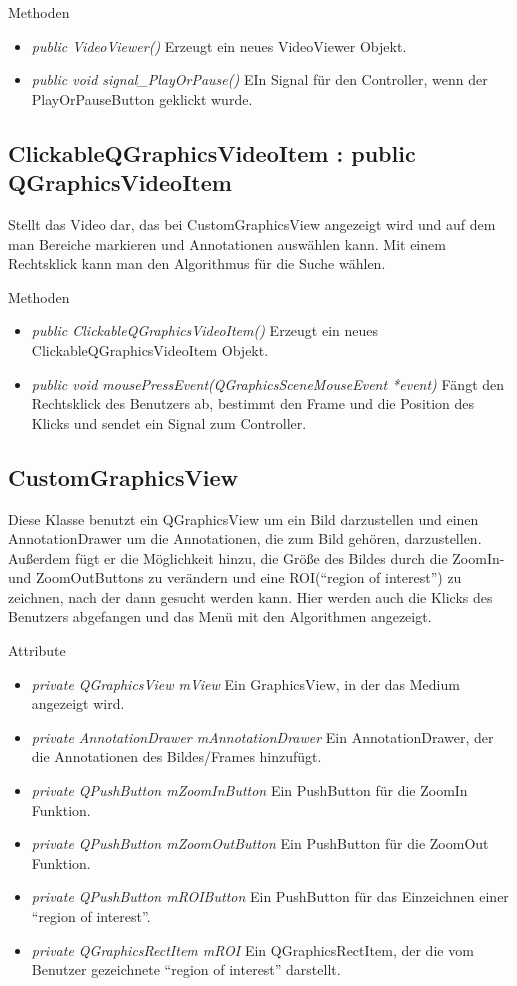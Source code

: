Methoden
\begin{itemize}
	\item\textit{public VideoViewer()} Erzeugt ein neues VideoViewer Objekt.
	\item\textit{public void signal\_PlayOrPause()} EIn Signal für den Controller, wenn der PlayOrPauseButton geklickt wurde.
\end{itemize} 

\subsection*{ClickableQGraphicsVideoItem : public QGraphicsVideoItem}
Stellt das Video dar, das bei CustomGraphicsView angezeigt wird und auf dem man Bereiche markieren und Annotationen auswählen kann. Mit einem Rechtsklick kann man den Algorithmus für die Suche wählen.

Methoden
\begin{itemize}
	\item\textit{public ClickableQGraphicsVideoItem()} Erzeugt ein neues ClickableQGraphicsVideoItem Objekt.
	\item\textit{public void mousePressEvent(QGraphicsSceneMouseEvent *event)} 
	Fängt den Rechtsklick des Benutzers ab, bestimmt den Frame und die Position des Klicks und sendet ein Signal zum Controller.
\end{itemize}

\subsection*{CustomGraphicsView}
Diese Klasse benutzt ein QGraphicsView um ein Bild darzustellen und einen AnnotationDrawer um die Annotationen, die zum Bild gehören, darzustellen. Außerdem fügt er die Möglichkeit hinzu, die Größe des Bildes durch die ZoomIn- und ZoomOutButtons zu verändern und eine ROI(\enquote{region of interest}) zu zeichnen, nach der dann gesucht werden kann. Hier werden auch die Klicks des Benutzers abgefangen und das Menü mit den Algorithmen angezeigt.

Attribute
\begin{itemize}
	\item\textit{private QGraphicsView mView} Ein GraphicsView, in der das Medium angezeigt wird. 
	\item\textit{private AnnotationDrawer mAnnotationDrawer} Ein AnnotationDrawer, der die Annotationen des Bildes/Frames hinzufügt. 
	\item\textit{private QPushButton mZoomInButton} Ein PushButton für die ZoomIn Funktion. 
	\item\textit{private QPushButton mZoomOutButton} 
	Ein PushButton für die ZoomOut Funktion.
	\item\textit{private QPushButton mROIButton} Ein PushButton für das Einzeichnen einer \enquote{region of interest}.
	\item\textit{private QGraphicsRectItem mROI} Ein QGraphicsRectItem, der die vom Benutzer gezeichnete \enquote{region of interest} darstellt.
\end{itemize}

